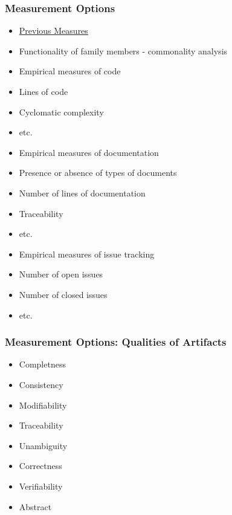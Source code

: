 \documentclass[t,12pt,numbers,fleqn]{beamer}
\begin{document}
\begin{frame}
\frametitle{Measurement Options}

\begin{itemize}

\item
  \href{https://github.com/adamlazz/DomainX/blob/master/TemplateToGradeSCSoft.pdf}
  {Previous Measures}
\item Functionality of family members - commonality analysis
\item Empirical measures of code
\bi
\item Lines of code
\item Cyclomatic complexity
\item etc.
\ei
\item Empirical measures of documentation
\bi
\item Presence or absence of types of documents
\item Number of lines of documentation
\item Traceability 
\item etc.
\ei
\item Empirical measures of issue tracking
\bi
\item Number of open issues
\item Number of closed issues
\item etc.
\ei

\end{itemize}

\end{frame}


\begin{frame}
\frametitle{Measurement Options: Qualities of Artifacts}

\begin{itemize}

\item Completness
\item Consistency
\item Modifiability
\item Traceability
\item Unambiguity
\item Correctness
\item Verifiability
\item Abstract

\end{itemize}

\end{frame}
\end{document}
